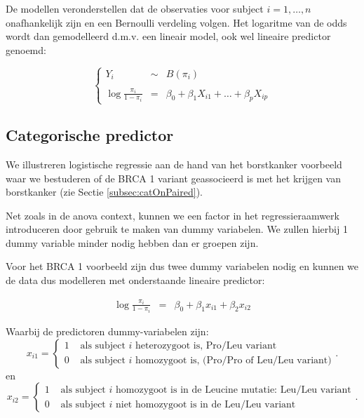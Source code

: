 \documentclass[12pt,dutch,coursenotes]{book}
\theoremstyle{definition}
\theoremstyle{definition}
\theoremstyle{definition}
\theoremstyle{remark}
\begin{document}
De modellen veronderstellen dat de observaties voor subject
\(i=1,\ldots,n\) onafhankelijk zijn en een Bernoulli verdeling volgen.
Het logaritme van de odds wordt dan gemodelleerd d.m.v. een lineair
model, ook wel lineaire predictor genoemd:

\begin{equation}
\left\{
\begin{array}{ccl}
Y_i&\sim&B(\pi_i)\\\\
\log \frac{\pi_i}{1-\pi_i}&=&\beta_0 + \beta_1X_{i1} + \ldots + \beta_p X_{ip}
\end{array}\right.
\end{equation}

\subsection{Categorische predictor}\label{categorische-predictor}

We illustreren logistische regressie aan de hand van het borstkanker
voorbeeld waar we bestuderen of de BRCA 1 variant geassocieerd is met
het krijgen van borstkanker (zie Sectie \ref{subsec:catOnPaired}).

Net zoals in de anova context, kunnen we een factor in het
regressieraamwerk introduceren door gebruik te maken van dummy
variabelen. We zullen hierbij 1 dummy variable minder nodig hebben dan
er groepen zijn.

Voor het BRCA 1 voorbeeld zijn dus twee dummy variabelen nodig en kunnen
we de data dus modelleren met onderstaande lineaire predictor:

\begin{eqnarray*}
  \log \frac{\pi_i}{1-\pi_i} &=& \beta_0+\beta_1 x_{i1} +\beta_2 x_{i2}
\end{eqnarray*}

Waarbij de predictoren dummy-variabelen zijn:
\[x_{i1} = \left\{ \begin{array}{ll} 
1 & \text{ als subject $i$ heterozygoot is, Pro/Leu variant} \\
0 & \text{ als subject $i$ homozygoot is, (Pro/Pro of Leu/Leu variant)} \end{array}\right. .\]
en \[x_{i2} = \left\{ \begin{array}{ll} 
1 & \text{ als subject $i$ homozygoot is in de Leucine mutatie: Leu/Leu variant} \\
0 & \text{ als subject $i$ niet homozygoot is in de Leu/Leu variant} \end{array}\right. .\]
\end{document}
